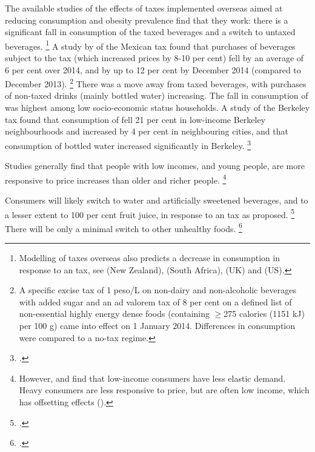 \documentclass[embargoed]{grattan}
\begin{document}
The available studies of the effects of \SSB{} taxes implemented overseas aimed at reducing consumption and obesity prevalence find that they work: there is a significant fall in consumption of the taxed beverages and a switch to untaxed beverages.%
\footnote{Modelling of \SSB{} taxes overseas also predicts a decrease in consumption in response to an \SSB{} tax, see \textcite{NiMhurchu2014Twentypercenttax} (New Zealand), \textcite{Manyema2014potentialimpact20} (South Africa), \textcite{Briggs2013Overallincomespecific} (UK) and \textcite{Long2015Costeffectivenesssugar} (US).} A study by \textcite{Colchero2016Beveragepurchasesstores} of the Mexican \SSB{} tax found that purchases of beverages subject to the tax (which increased prices by 8-10 per cent) fell by an average of 6 per cent over 2014, and by up to 12 per cent by December 2014 (compared to December 2013).%
\footnote{A specific excise tax of 1 peso/L on non-dairy and non-alcoholic beverages with added sugar and an ad valorem tax of 8 per cent on a defined list of non-essential highly energy dense foods (containing \(\geq\)275 calories (1151 kJ) per 100 g) came into effect on 1 January 2014.
Differences in consumption were compared to a no-tax regime.} There was a move away from taxed beverages, with purchases of non-taxed drinks (mainly bottled water) increasing.
The fall in consumption of \SSBs{} was highest among low socio-economic status households.
A study of the Berkeley \SSB{} tax found that consumption of \SSBs{} fell 21 per cent in low-income Berkeley neighbourhoods and increased by 4 per cent in neighbouring cities, and that consumption of bottled water increased significantly in Berkeley.%
\footcite{Falbe2016ImpactBerkeleyExcise}

Studies generally find that people with low incomes, and young people, are more responsive to price increases than older and richer people.%
\footnote{\textcites{Yang2016child}{Colchero2016Beveragepurchasesstores}{Organization2016FiscalPoliciesDiet}{Batis2016FirstYearEvaluation}{Sharma2014effectstaxingsugarsweetened}{Coalition2016Policybriefcase}{Friedman2012Sugarsweetenedbeverage}{Clements2015PriceElasticitiesFood} However, \textcite{Finkelstein2010EconomicsObesity} and \textcite{Lin2011Measuringweightoutcomes} find that low-income consumers have less elastic demand.
Heavy \SSB{} consumers are less responsive to price, but are often low income, which has offsetting effects (\textcites{Organization2016FiscalPoliciesDiet}{Etile2015DoHighConsumers}).}

Consumers will likely switch to water and artificially sweetened beverages, and to a lesser extent to 100 per cent fruit juice, in response to an \SSB{} tax as proposed.%
\footcites{Finkelstein2013Implicationssugarsweetened}{Colchero2016Beveragepurchasesstores}{LeBodo2016CanadianSodaTax}{Briggs2013Overallincomespecific} There will be only a minimal switch to other unhealthy foods.%
\footcite{Finkelstein2013Implicationssugarsweetened}
\end{document}
